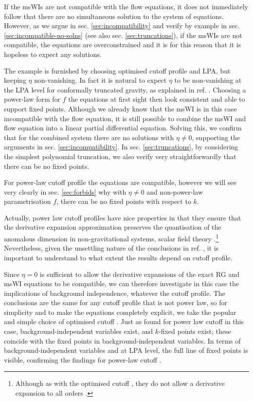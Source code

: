 \documentclass[11pt]{book} %
\begin{document}
If the msWIs are not compatible with the flow equations, it does not immediately follow that there are no simultaneous solution to the system of equations. However, as we argue in sec. \ref{sec:incompatibility} and verify by example in sec. \ref{sec:incompatible-no-solns} (see also sec. \ref{sec:truncations}), if the msWIs are not compatible, the equations are overconstrained and it is for this reason that it is hopeless to expect any solutions.

The example is furnished by choosing optimised cutoff profile and LPA, but keeping $\eta$ non-vanishing.
In fact it is natural to expect $\eta$ to be non-vanishing at the LPA level for conformally truncated gravity, as explained in ref. \cite{Dietz2016}.  Choosing a power-law form for $f$ the equations at first sight then look consistent and able to support fixed points. Although we already know that the msWI is in this case incompatible with the flow equation, it is still possible to combine the msWI and flow equation into a linear partial differential equation. Solving this, we confirm that for the combined system there are no solutions with $\eta\ne0$, supporting the arguments in sec. \ref{sec:incompatibility}. In sec. \ref{sec:truncations}, by considering the simplest polynomial truncation, we also verify very straightforwardly that there can be no fixed points. 

For power-law cutoff profile the equations are compatible, however we will see very clearly in sec. \ref{sec:forbids} why with $\eta\ne0$ and non-power-law parametrisation $f$, there can be no fixed points with respect to $k$.

Actually, power law cutoff profiles have nice properties in  that they ensure that the derivative expansion approximation preserves the quantisation of the anomalous dimension in non-gravitational systems, \eg scalar field theory \cite{Morris:1994ie,Morris:1994jc,Morris:1998}.\footnote{Although as with the optimised cutoff \cite{opt1,opt3}, they do not allow a derivative expansion to all orders \cite{Morris:2005ck,Morris1999,Morris2001}.} Nevertheless, given the unsettling nature of the conclusions in ref. \cite{Dietz:2015owa}, it is important to understand  to what extent the results depend on cutoff profile. 

Since $\eta=0$ is sufficient to allow the derivative expansions of the exact RG and msWI equations to be compatible, we can therefore investigate in this case the implications of background independence, whatever the cutoff profile. The conclusions are the same for any cutoff profile that is not power law, so for simplicity and to make the equations completely explicit, we take the popular and simple choice of optimised cutoff \cite{opt1,opt3}.  Just as found for power law cutoff \cite{Dietz2016} in this case, background-independent variables exist, and $k$-fixed points exist; these coincide with the fixed points in background-independent variables.  In terms of background-independent variables and at LPA level, the full line of fixed points
is visible, confirming the findings for power-law cutoff \cite{Dietz2016}.
\end{document}
